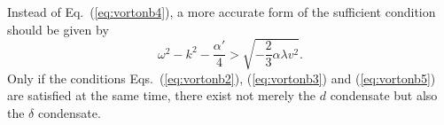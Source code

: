 \documentclass[12pt]{article}
\begin{document}
Instead of Eq.~(\ref{eq:vortonb4}), a more accurate form
of the sufficient condition should be given by
\begin{equation}
  \label{eq:vortonb5}
  \omega^2 - k^2 -\frac{\alpha'}{4} > \sqrt{- \frac{2}{3}\alpha \lambda v^2}.
\end{equation}
Only if the conditions Eqs.~(\ref{eq:vortonb2}), (\ref{eq:vortonb3}) and (\ref{eq:vortonb5}) are
satisfied at the same time, there exist not merely the $d$ condensate 
but also the $\delta$ condensate.
\end{document}
